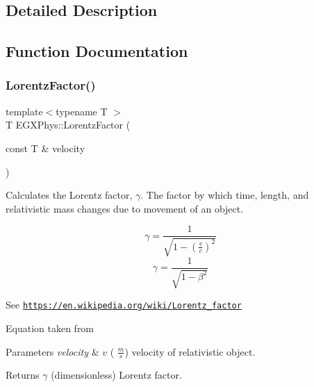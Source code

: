 \subsection{Detailed Description}


\subsection{Function Documentation}
\mbox{\label{group___relativity_ga5f9b11c1f4c3ae26a7e64f02c22d5a75}} 
\subsubsection{\texorpdfstring{Lorentz\+Factor()}{LorentzFactor()}}
{\footnotesize\ttfamily template$<$typename T $>$ \\
T E\+G\+X\+Phys\+::\+Lorentz\+Factor (\begin{DoxyParamCaption}\item[{const T \&}]{velocity }\end{DoxyParamCaption})}



Calculates the Lorentz factor, $\gamma$. The factor by which time, length, and relativistic mass changes due to movement of an object. 

\[\gamma=\frac{1}{\sqrt{1-(\frac{v}{c})^2}}\] \[\gamma=\frac{1}{\sqrt{1-\beta^2}}\]

See \href{https://en.wikipedia.org/wiki/Lorentz_factor}{\tt https\+://en.\+wikipedia.\+org/wiki/\+Lorentz\+\_\+factor}

Equation taken from


\begin{DoxyParams}{Parameters}
{\em velocity} & $v$ ( $\frac{m}{s}$) velocity of relativistic object. \\
\hline
\end{DoxyParams}
\begin{DoxyReturn}{Returns}
$\gamma$ (dimensionless) Lorentz factor. 
\end{DoxyReturn}
\mbox{\label{group___relativity_ga601de8c039be89a9abea22bc459436c9}} 

